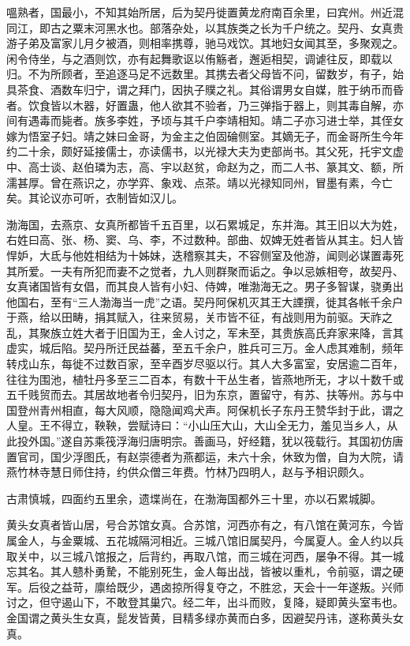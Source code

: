 \documentclass[]{article}
\begin{document}
嗢熟者，国最小，不知其始所居，后为契丹徙置黄龙府南百余里，曰宾州。州近混同江，即古之粟末河黑水也。部落杂处，以其族类之长为千户统之。契丹、女真贵游子弟及富家儿月夕被酒，则相率携尊，驰马戏饮。其地妇女闻其至，多聚观之。闲令侍坐，与之酒则饮，亦有起舞歌讴以侑觞者，邂逅相契，调谑往反，即载以归。不为所顾者，至追逐马足不远数里。其携去者父母皆不问，留数岁，有子，始具茶食、酒数车归宁，谓之拜门，因执子贌之礼。其俗谓男女自媒，胜于纳币而昏者。饮食皆以木器，好置蛊，他人欲其不验者，乃三弹指于器上，则其毒自解，亦间有遇毒而毙者。族多李姓，予顷与其千户李靖相知。靖二子亦习进士举，其侄女嫁为悟室子妇。靖之妹曰金哥，为金主之伯固碖侧室。其嫡无子，而金哥所生今年约二十余，颇好延接儒士，亦读儒书，以光禄大夫为吏部尚书。其父死，托宇文虚中、高士谈、赵伯璘为志，高、宇以赵贫，命赵为之，而二人书、篆其文、额，所濡甚厚。曾在燕识之，亦学弈、象戏、点茶。靖以光禄知同州，冒墨有素，今亡矣。其论议亦可听，衣制皆如汉儿。

渤海国，去燕京、女真所都皆千五百里，以石累城足，东并海。其王旧以大为姓，右姓曰高、张、杨、窦、乌、李，不过数种。部曲、奴婢无姓者皆从其主。妇人皆悍妒，大氐与他姓相结为十姊妹，迭稽察其夫，不容侧室及他游，闻则必谋置毒死其所爱。一夫有所犯而妻不之觉者，九人则群聚而诟之。争以忌嫉相夸，故契丹、女真诸国皆有女倡，而其良人皆有小妇、侍婢，唯渤海无之。男子多智谋，骁勇出他国右，至有``三人渤海当一虎''之语。契丹阿保机灭其王大諲撰，徙其各帐千余户于燕，给以田畴，捐其赋入，往来贸易，关市皆不征，有战则用为前驱。天祚之乱，其聚族立姓大者于旧国为王，金人讨之，军未至，其贵族高氏弃家来降，言其虚实，城后陷。契丹所迁民益蕃，至五千余户，胜兵可三万。金人虑其难制，频年转戍山东，每徙不过数百家，至辛酉岁尽驱以行。其人大多富室，安居逾二百年，往往为围池，植牡丹多至三二百本，有数十干丛生者，皆燕地所无，才以十数千或五千贱贸而去。其居故地者令归契丹，旧为东京，置留守，有苏、扶等州。苏与中国登州青州相直，每大风顺，隐隐闻鸡犬声。阿保机长子东丹王赞华封于此，谓之人皇。王不得立，鞅鞅，尝赋诗曰：``小山压大山，大山全无力，羞见当乡人，从此投外国。''遂自苏乘筏浮海归唐明宗。善画马，好经籍，犹以筏载行。其国初仿唐置官司，国少浮图氏，有赵崇德者为燕都运，未六十余，休致为僧，自为大院，请燕竹林寺慧日师住持，约供众僧三年费。竹林乃四明人，赵与予相识颇久。

古肃慎城，四面约五里余，遗堞尚在，在渤海国都外三十里，亦以石累城脚。

黄头女真者皆山居，号合苏馆女真。合苏馆，河西亦有之，有八馆在黄河东，今皆属金人，与金粟城、五花城隔河相近。三城八馆旧属契丹，今属夏人。金人约以兵取关中，以三城八馆报之，后背约，再取八馆，而三城在河西，屡争不得。其一城忘其名。其人戆朴勇騺，不能别死生，金人每出战，皆被以重札，令前驱，谓之硬军。后役之益苛，廪给既少，遇卤掠所得复夺之，不胜忿，天会十一年遂叛。兴师讨之，但守遏山下，不敢登其巢穴。经二年，出斗而败，复降，疑即黄头室韦也。金国谓之黄头生女真，髭发皆黄，目精多绿亦黄而白多，因避契丹讳，遂称黄头女真。
\end{document}
